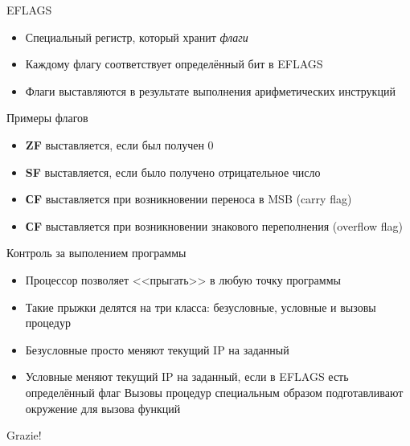 \documentclass[10pt,pdf,hyperref={unicode}]{beamer}
\begin{document}
\begin{frame}{EFLAGS}
\begin{itemize}
    \item Специальный регистр, который хранит \emph{флаги}
    \item Каждому флагу соответствует определённый бит в EFLAGS
    \item Флаги выставляются в результате выполнения арифметических инструкций
\end{itemize}
\end{frame}


\begin{frame}{Примеры флагов}
\begin{itemize}
    \item \textbf{ZF} выставляется, если был получен 0
    \item \textbf{SF} выставляется, если было получено отрицательное число
    \item \textbf{СF} выставляется при возникновении переноса в MSB (carry flag)
    \item \textbf{СF} выставляется при возникновении знакового переполнения (overflow flag)
\end{itemize}
\end{frame}

\begin{frame}{Контроль за выполением программы}
\begin{itemize}
    \item Процессор позволяет <<прыгать>> в любую точку программы
    \item Такие прыжки делятся на три класса: безусловные, условные и вызовы процедур
    \item Безусловные просто меняют текущий IP на заданный
    \item Условные меняют текущий IP на заданный, если в EFLAGS есть определённый флаг
    \iteme Вызовы процедур специальным образом подготавливают окружение для вызова функций
\end{itemize}
\end{frame}


\begin{frame}
\center\Huge{Grazie!}
\end{frame}
\end{document}
